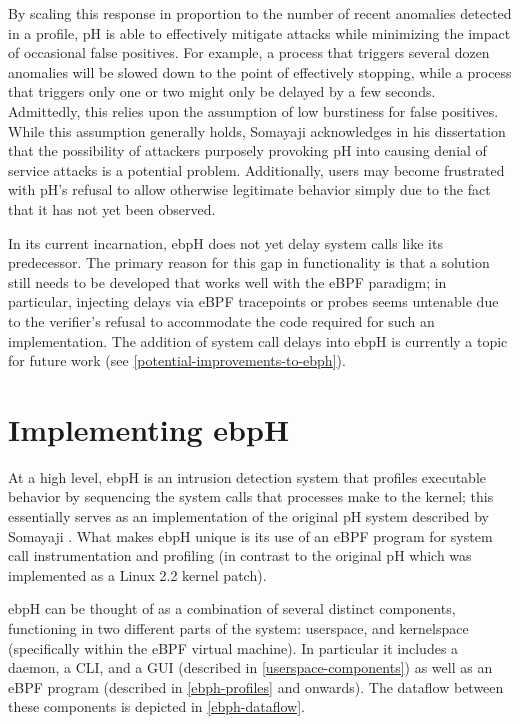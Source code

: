 \documentclass[
  12pt]{findlay}
\begin{document}
By scaling this response in proportion to the number of recent anomalies
detected in a profile, pH is able to effectively mitigate attacks while
minimizing the impact of occasional false positives. For example, a
process that triggers several dozen anomalies will be slowed down to the
point of effectively stopping, while a process that triggers only one or
two might only be delayed by a few seconds. Admittedly, this relies upon
the assumption of low burstiness for false positives. While this
assumption generally holds, Somayaji acknowledges in his dissertation
\autocite{soma02} that the possibility of attackers purposely provoking
pH into causing denial of service attacks is a potential problem.
Additionally, users may become frustrated with pH's refusal to allow
otherwise legitimate behavior simply due to the fact that it has not yet
been observed.

In its current incarnation, ebpH does not yet delay system calls like
its predecessor. The primary reason for this gap in functionality is
that a solution still needs to be developed that works well with the
eBPF paradigm; in particular, injecting delays via eBPF tracepoints or
probes seems untenable due to the verifier's refusal to accommodate the
code required for such an implementation. The addition of system call
delays into ebpH is currently a topic for future work (see
\autoref{potential-improvements-to-ebph}).

\hypertarget{implementing-ebph}{%
\section{Implementing ebpH}\label{implementing-ebph}}

At a high level, ebpH is an intrusion detection system that profiles
executable behavior by sequencing the system calls that processes make
to the kernel; this essentially serves as an implementation of the
original pH system described by Somayaji \autocite{soma02}. What makes
ebpH unique is its use of an eBPF program for system call
instrumentation and profiling (in contrast to the original pH which was
implemented as a Linux 2.2 kernel patch).

ebpH can be thought of as a combination of several distinct components,
functioning in two different parts of the system: userspace, and
kernelspace (specifically within the eBPF virtual machine). In
particular it includes a daemon, a CLI, and a GUI (described in
\autoref{userspace-components}) as well as an eBPF program (described in
\autoref{ebph-profiles} and onwards). The dataflow between these
components is depicted in \autoref{ebph-dataflow}.
\end{document}
